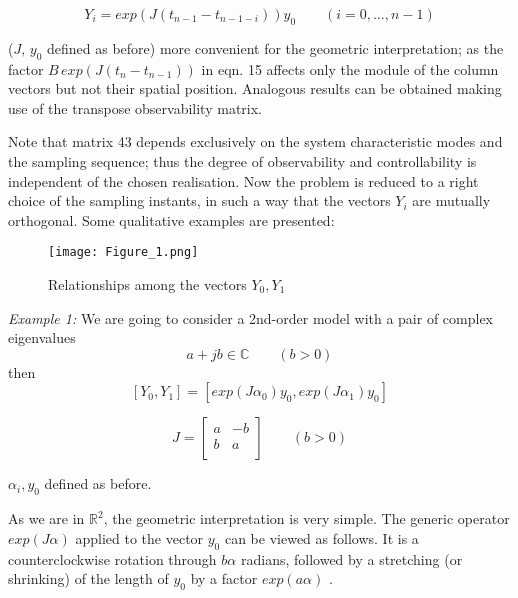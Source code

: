 \documentclass{article}
\begin{document}
\begin{equation}\label{eq:44}
Y_i = exp (J(t_{n-1}- t_{n-1-i}))y_0 \qquad (i = 0, \ldots , n-1)
\end{equation}

($J, \, y_0$ defined as before) more convenient for the
geometric interpretation; as the factor $B\, exp (J(t_n - t_{n-1}))$ in
eqn. 15 affects only the module of the column vectors but not
their spatial position. Analogous results can be obtained making
use of the transpose observability matrix.

Note that matrix 43 depends exclusively on the system
characteristic modes and the sampling sequence; thus the degree of
observability and controllability is independent of the chosen
realisation. Now the problem is reduced to a right choice of the
sampling instants, in such a way that the vectors $Y_i$ are
mutually orthogonal. Some qualitative examples are presented:

\begin{figure}
\begin{center}
\texttt{[image: Figure\_1.png]}
\caption{Relationships among the vectors $Y_0, Y_1$}
\label{figure:headings1}
\end{center}
\end{figure}

\textit{Example 1:} We are going to
consider a 2nd-order model with a pair of complex eigenvalues
\begin{equation}\label{eq:45}
a + jb \in \mathbb{C} \qquad (b > 0)
\end{equation}
then
\begin{equation}\label{eq:46}
[Y_0, Y_1] = [exp (J\alpha_0)y_0, exp (J\alpha_1)y_0]
\end{equation}

\begin{equation}\label{eq:47}
J = \left[
    \begin{array}{cc}
      a & -b \\
      b & a \\
    \end{array}
  \right]
\qquad (b > 0)
\end{equation}

$\alpha_i, y_0$ defined as before.

As we are in $\mathbb{R}^2$, the geometric
interpretation is very simple. The generic operator $exp (J\alpha)$
applied to the vector $y_0$ can be viewed as follows. It is a
counterclockwise rotation through $b\alpha$ radians, followed by a
stretching (or shrinking) of the length of $y_0$ by a factor $exp (a\alpha)$ \cite{Hirsch}.
\end{document}
